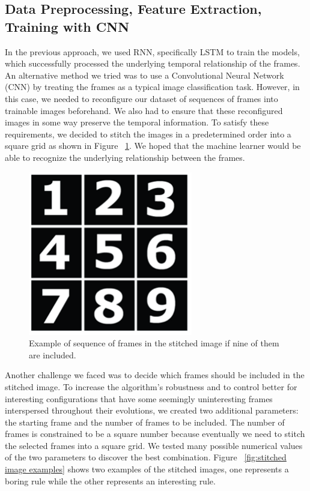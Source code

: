 \documentclass[12pt]{article}
\numberwithin{figure}{section} %
\begin{document}
\subsection{Data Preprocessing, Feature Extraction, Training with CNN}
In the previous approach, we used RNN, specifically LSTM to train the models, which successfully processed the underlying temporal relationship of the frames. An alternative method we tried was to use a Convolutional Neural Network (CNN) by treating the frames as a typical image classification task. However, in this case, we needed to reconfigure our dataset of sequences of frames into trainable images beforehand. We also had to ensure that these reconfigured images in some way preserve the temporal information. To satisfy these requirements, we decided to stitch the images in a predetermined order into a square grid as shown in Figure ~\ref{fig:stitched square grid}. We hoped that the machine learner would be able to recognize the underlying relationship between the frames. 
 
\begin{figure}[H]
\centering
\includegraphics[width=0.3\linewidth]{Section3/2}
\caption[Stitched square grid]{Example of sequence of frames in the stitched image if nine of them are included.}
\vspace{-1.5em}
\label{fig:stitched square grid}
\end{figure}
Another challenge we faced was to decide which frames should be included in the stitched image. To increase the algorithm’s robustness and to control better for interesting configurations that have some seemingly uninteresting frames interspersed throughout their evolutions, we created two additional parameters: the starting frame and the number of frames to be included. The number of frames is constrained to be a square number because eventually we need to stitch the selected frames into a square grid. We tested many possible numerical values of the two parameters to discover the best combination. Figure ~\ref{fig:stitched image examples} shows two examples of the stitched images, one represents a boring rule while the other represents an interesting rule. 
\end{document}
